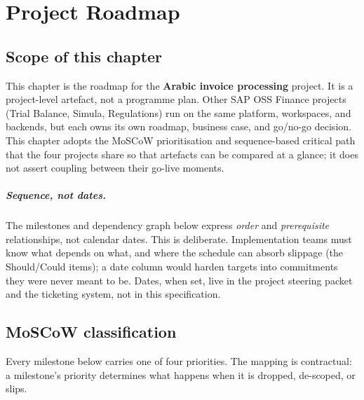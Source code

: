 \chapter{Project Roadmap}\label{ch:ap-roadmap}

\section*{Scope of this chapter}

This chapter is the roadmap for the \textbf{Arabic invoice processing}
project. It is a project-level artefact, not a programme plan. Other
SAP OSS Finance projects (Trial Balance, Simula, Regulations) run on
the same platform, workspaces, and backends, but each owns its own
roadmap, business case, and go/no-go decision. This chapter adopts the
MoSCoW prioritisation and sequence-based critical path that the four
projects share so that artefacts can be compared at a glance; it does
not assert coupling between their go-live moments.

\paragraph{Sequence, not dates.}
The milestones and dependency graph below express \emph{order} and
\emph{prerequisite} relationships, not calendar dates. This is
deliberate. Implementation teams must know what depends on what, and
where the schedule can absorb slippage (the Should/Could items); a
date column would harden targets into commitments they were never
meant to be. Dates, when set, live in the project steering packet and
the ticketing system, not in this specification.

\section{MoSCoW classification}\label{sec:ap-moscow}

Every milestone below carries one of four priorities. The mapping is
contractual: a milestone's priority determines what happens when it is
dropped, de-scoped, or slips.

